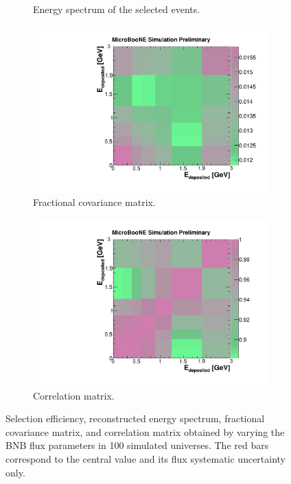 \begin{figure}[htbp]
\begin{center}
\begin{subfigure}{0.48\textwidth}
      \caption{Energy spectrum of the selected events.}  \label{fig:reco_flux}
    \end{subfigure}
    \begin{subfigure}{0.48\textwidth}
      \includegraphics[width=\linewidth]{figures/frac_flux.pdf}
      \caption{Fractional covariance matrix.}  \label{fig:frac_flux}
    \end{subfigure}\hfill
    \begin{subfigure}{0.48\textwidth}
      \includegraphics[width=\linewidth]{figures/corr_flux.pdf}
      \caption{Correlation matrix.}  \label{fig:corr_flux}
    \end{subfigure}
    \caption{Selection efficiency, reconstructed energy spectrum, fractional covariance matrix, and correlation matrix obtained by varying the BNB flux parameters in 100 simulated universes. The red bars correspond to the central value and its flux systematic uncertainty only.}\label{fig:flux_sys}
	\end{center}
\end{figure}

